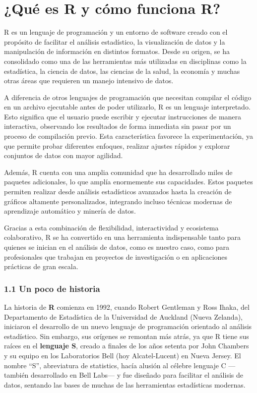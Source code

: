 \documentclass[
  letterpaper,
]{scrbook}
\begin{document}
\hypertarget{quuxe9-es-r-y-cuxf3mo-funciona-r}{%
\chapter{¿Qué es R y cómo funciona
R?}\label{quuxe9-es-r-y-cuxf3mo-funciona-r}}

R es un lenguaje de programación y un entorno de software creado con el
propósito de facilitar el análisis estadístico, la visualización de
datos y la manipulación de información en distintos formatos. Desde su
origen, se ha consolidado como una de las herramientas más utilizadas en
disciplinas como la estadística, la ciencia de datos, las ciencias de la
salud, la economía y muchas otras áreas que requieren un manejo
intensivo de datos.

A diferencia de otros lenguajes de programación que necesitan compilar
el código en un archivo ejecutable antes de poder utilizarlo, R es un
lenguaje interpretado. Esto significa que el usuario puede escribir y
ejecutar instrucciones de manera interactiva, observando los resultados
de forma inmediata sin pasar por un proceso de compilación previo. Esta
característica favorece la experimentación, ya que permite probar
diferentes enfoques, realizar ajustes rápidos y explorar conjuntos de
datos con mayor agilidad.

Además, R cuenta con una amplia comunidad que ha desarrollado miles de
paquetes adicionales, lo que amplía enormemente sus capacidades. Estos
paquetes permiten realizar desde análisis estadísticos avanzados hasta
la creación de gráficos altamente personalizados, integrando incluso
técnicas modernas de aprendizaje automático y minería de datos.

Gracias a esta combinación de flexibilidad, interactividad y ecosistema
colaborativo, R se ha convertido en una herramienta indispensable tanto
para quienes se inician en el análisis de datos, como es nuestro caso,
como para profesionales que trabajan en proyectos de investigación o en
aplicaciones prácticas de gran escala.

\hypertarget{un-poco-de-historia}{%
\subsection{1.1 Un poco de historia}\label{un-poco-de-historia}}

La historia de \textbf{R} comienza en 1992, cuando Robert Gentleman y
Ross Ihaka, del Departamento de Estadística de la Universidad de
Auckland (Nueva Zelanda), iniciaron el desarrollo de un nuevo lenguaje
de programación orientado al análisis estadístico. Sin embargo, sus
orígenes se remontan más atrás, ya que R tiene sus raíces en el
\textbf{lenguaje S}, creado a finales de los años setenta por John
Chambers y su equipo en los Laboratorios Bell (hoy Alcatel-Lucent) en
Nueva Jersey. El nombre ``S'', abreviatura de statistics, hacía alusión
al célebre lenguaje C ---también desarrollado en Bell Labs--- y fue
diseñado para facilitar el análisis de datos, sentando las bases de
muchas de las herramientas estadísticas modernas.
\end{document}
